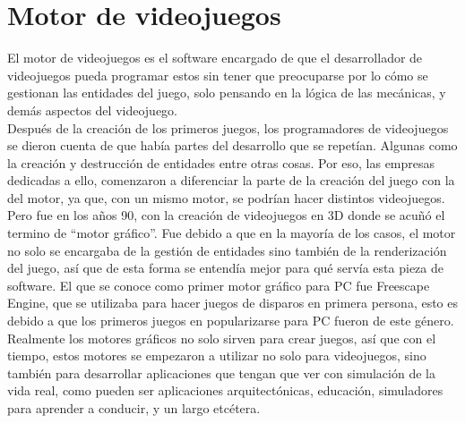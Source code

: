\section{Motor de videojuegos}
El motor de videojuegos es el software encargado de que el desarrollador de videojuegos pueda programar estos sin tener que preocuparse por lo cómo se gestionan las entidades del juego, solo pensando en la lógica de las mecánicas, y demás aspectos del videojuego. 
\\
Después de la creación de los primeros juegos, los programadores de videojuegos se dieron cuenta de que había partes del desarrollo que se repetían. Algunas como la creación y destrucción de entidades entre otras cosas. Por eso, las empresas dedicadas a ello, comenzaron a diferenciar la parte de la creación del juego con la del motor, ya que, con un mismo motor, se podrían hacer distintos videojuegos.
\\
Pero fue en los años 90, con la creación de videojuegos en 3D donde se acuñó el termino de ``motor gráfico''. Fue debido a que en la mayoría de los casos, el motor no solo se encargaba de la gestión de entidades sino también de la renderización del juego, así que de esta forma se entendía mejor para qué servía esta pieza de software. El que se conoce como primer motor gráfico para PC fue Freescape Engine, que se utilizaba para hacer juegos de disparos en primera persona, esto es debido a que los primeros juegos en popularizarse para PC fueron de este género.
\\
Realmente los motores gráficos no solo sirven para crear juegos, así que con el tiempo, estos motores se empezaron a utilizar no solo para videojuegos, sino también para desarrollar aplicaciones que tengan que ver con simulación de la vida real, como pueden ser aplicaciones arquitectónicas, educación, simuladores para aprender a conducir, y un largo etcétera.


